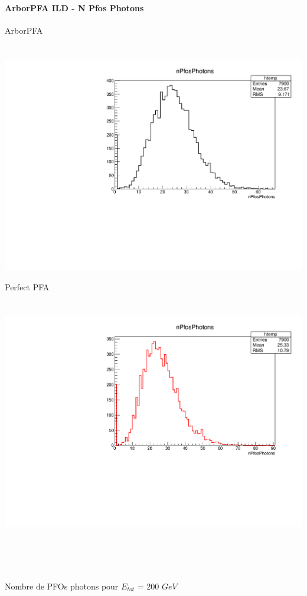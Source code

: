\documentclass[8pt]{beamer}
\begin{document}
  \begin{frame}
  \frametitle{\backup}
  \framesubtitle{ArborPFA ILD - N Pfos Photons}
    \begin{minipage}{0.48\linewidth}
      \begin{center}
        ArborPFA \\
        ~ \\
        ~~~~~\includegraphics[width=\linewidth]{nPfosPhotons_ArborPFA.pdf}
      \end{center}
    \end{minipage}
    \begin{minipage}{0.48\linewidth}
      \begin{center}
        Perfect PFA \\
        ~ \\
        ~~~~~\includegraphics[width=\linewidth]{nPfosPhotons_PerfectPFA.pdf}
      \end{center}
    \end{minipage}
    ~ \\
    ~ \\
    ~ \\
    \begin{center} Nombre de PFOs photons pour $E_{tot}$ = 200 $GeV$ \end{center}
  \end{frame}
\end{document}
